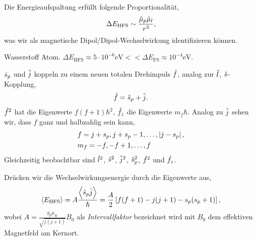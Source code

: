 Die Energieaufspaltung erfüllt folgende
Proportionalität,
\begin{align*}
\Delta E_{\text{HFS}} \sim \frac{\hat{\boldmath{\mu}}_p\hat{\boldmath{\mu}}_l}{r^3},
\end{align*}
was wir als magnetische Dipol/Dipol-Wechselwirkung identifizieren können.
\begin{bspn}
Wasserstoff Atom. $\Delta E_{\text{HFS}} \approx 5\cdot 10^{-6}\mathrm{eV}<<
\Delta E_{\text{FS}} \approx 10^{-4}\mathrm{eV}$.\bsphere
\end{bspn}
$\hat{\boldmath{s}}_p$ und $\hat{\boldmath{j}}$ koppeln zu einem neuen totalen Drehimpuls $\hat{\boldmath{f}}$,
analog zur $\hat{\boldmath{l}}$, $\hat{\boldmath{s}}$-Kopplung,
\begin{align*}
\hat{\boldmath{f}} = \hat{\boldmath{s}}_p + \hat{\boldmath{j}}.
\end{align*}
$\hat{\boldmath{f}}^2$ hat die Eigenwerte $f(f+1)\hbar^2$, $\hat{\boldmath{f}}_z$ die Eigenwerte $m_f
\hbar$. Analog zu $\hat{\boldmath{j}}$ sehen wir, dass $f$ ganz und halbzahlig sein
kann,
\begin{align*}
&f = j+s_p,j+s_p-1,\ldots, \left|j-s_p\right|,\\
&m_f = -f,-f+1,\ldots,f
\end{align*}
Gleichzeitig beobachtbar sind $\hat{\boldmath{l}}^2$, $\hat{\boldmath{s}}^2$, $\hat{\boldmath{j}}^2$, $\hat{\boldmath{s}}_p^2$,
$\hat{\boldmath{f}}^2$ und $\hat{\boldmath{f}}_z$.

Drücken wir die Wechselwirkungsenergie durch die
Eigenwerte aus,
\begin{align*}
\left\langle E_\text{HFS}\right\rangle = A \frac{\left\langle\hat{\boldmath{s}}_p\hat{\boldmath{j}}\right\rangle}{\hbar} = \frac{A}{2}
\left[f(f+1)-j(j+1)-s_p(s_p+1)\right],
\end{align*}
wobei $A=\frac{g_p \mu_K}{\sqrt{j(j+1)}}B_0$ als \emph{Intervallfaktor}
bezeichnet wird mit $B_0$ dem effektiven Magnetfeld am Kernort.

